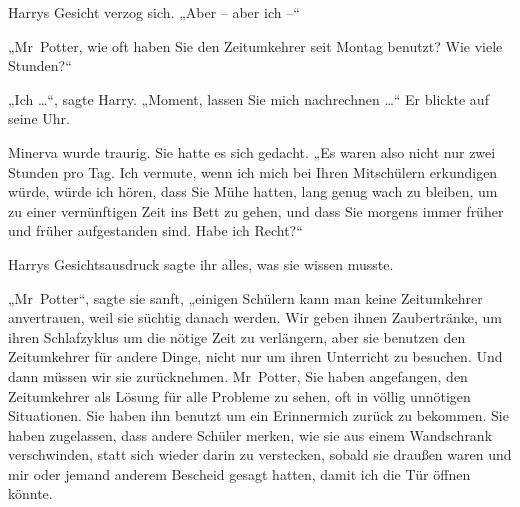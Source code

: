 Harrys Gesicht verzog sich. „Aber – aber ich –“ 

„Mr~Potter, wie oft haben Sie den Zeitumkehrer seit Montag benutzt? Wie viele Stunden?“ 

„Ich …“, sagte Harry. „Moment, lassen Sie mich nachrechnen …“ Er blickte auf seine Uhr. 

Minerva wurde traurig. Sie hatte es sich gedacht. „Es waren also nicht nur zwei Stunden pro Tag. Ich vermute, wenn ich mich bei Ihren Mitschülern erkundigen würde, würde ich hören, dass Sie Mühe hatten, lang genug wach zu bleiben, um zu einer vernünftigen Zeit ins Bett zu gehen, und dass Sie morgens immer früher und früher aufgestanden sind. Habe ich Recht?“ 

Harrys Gesichtsausdruck sagte ihr alles, was sie wissen musste. 

„Mr~Potter“, sagte sie sanft, „einigen Schülern kann man keine Zeitumkehrer anvertrauen, weil sie süchtig danach werden. Wir geben ihnen Zaubertränke, um ihren Schlafzyklus um die nötige Zeit zu verlängern, aber sie benutzen den Zeitumkehrer für andere Dinge, nicht nur um ihren Unterricht zu besuchen. Und dann müssen wir sie zurücknehmen. Mr~Potter, Sie haben angefangen, den Zeitumkehrer als Lösung für alle Probleme zu sehen, oft in völlig unnötigen Situationen. Sie haben ihn benutzt um ein Erinnermich zurück zu bekommen. Sie haben zugelassen, dass andere Schüler merken, wie sie aus einem Wandschrank verschwinden, statt sich wieder darin zu verstecken, sobald sie draußen waren und mir oder jemand anderem Bescheid gesagt hatten, damit ich die Tür öffnen könnte. 

